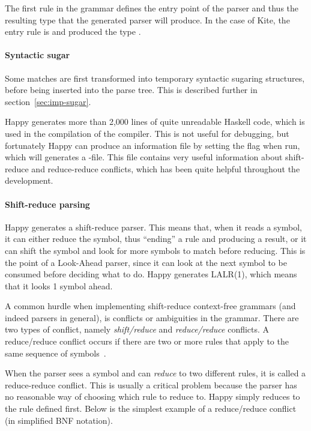 The first rule in the grammar defines the entry point of the parser and thus the resulting type that the generated parser will produce. In the case of Kite, the entry rule is  and produced the type \code{[Decl]}.

\paragraph{Syntactic sugar}
Some matches are first transformed into temporary syntactic sugaring structures, before being inserted into the parse tree. This is described further in section~\ref{sec:imp-sugar}.

Happy generates more than 2,000 lines of quite unreadable Haskell code, which is used in the compilation of the compiler. This is not useful for debugging, but fortunately Happy can produce an information file by setting the  flag when run, which will generates a -file. This file contains very useful information about shift-reduce and reduce-reduce conflicts, which has been quite helpful throughout the development.

\paragraph{Shift-reduce parsing}
Happy generates a shift-reduce parser. This means that, when it reads a symbol, it can either reduce the symbol, thus ``ending'' a rule and producing a result, or it can shift the symbol and look for more symbols to match before reducing. This is the point of a Look-Ahead parser, since it can look at the next symbol to be consumed before deciding what to do. Happy generates LALR(1), which means that it looks 1 symbol ahead.

A common hurdle when implementing shift-reduce context-free grammars (and indeed parsers in general), is conflicts or ambiguities in the grammar. There are two types of conflict, namely \emph{shift/reduce} and \emph{reduce/reduce} conflicts. A reduce/reduce conflict occurs if there are two or more rules that apply to the same sequence of symbols~\cite[sec. 5.6]{bison13}.

When the parser sees a symbol and can \emph{reduce} to two different rules, it is called a reduce-reduce conflict. This is usually a critical problem because the parser has no reasonable way of choosing which rule to reduce to. Happy simply reduces to the rule defined first. Below is the simplest example of a reduce/reduce conflict (in simplified BNF notation).

